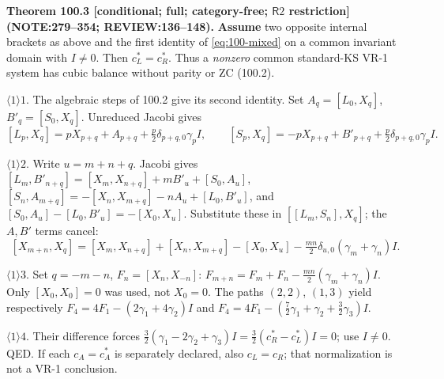 \textbf{Theorem 100.3 [conditional; full; category-free; \(\mathsf R2\) restriction] (NOTE:279--354; REVIEW:136--148).}
\textbf{Assume} two opposite internal brackets as above and the first identity of \eqref{eq:100-mixed}
on a common invariant domain with \(I\ne0\). Then \(c_L^*=c_R^*\).
Thus a \emph{nonzero} common standard-KS VR-1 system has cubic balance without parity or ZC (100.2).
\par\(\langle1\rangle1\). The algebraic steps of 100.2 give its second identity. Set
\(A_q=[L_0,X_q]\), \(B'_q=[S_0,X_q]\). Unreduced Jacobi gives
\[
 [L_p,X_q]=pX_{p+q}+A_{p+q}+\tfrac p2\delta_{p+q,0}\gamma_pI,\qquad
 [S_p,X_q]=-pX_{p+q}+B'_{p+q}+\tfrac p2\delta_{p+q,0}\gamma_pI.
\]
\par\(\langle1\rangle2\). Write \(u=m+n+q\). Jacobi gives
\([L_m,B'_{n+q}]=[X_m,X_{n+q}]+mB'_u+[S_0,A_u]\),
\([S_n,A_{m+q}]=-[X_n,X_{m+q}]-nA_u+[L_0,B'_u]\), and
\([S_0,A_u]-[L_0,B'_u]=-[X_0,X_u]\). Substitute these in \([[L_m,S_n],X_q]\); the \(A,B'\) terms cancel:
\[
 [X_{m+n},X_q]=[X_m,X_{n+q}]+[X_n,X_{m+q}]-[X_0,X_u]
 -\tfrac{mn}{2}\delta_{u,0}(\gamma_m+\gamma_n)I.
\]
\par\(\langle1\rangle3\). Set \(q=-m-n\), \(F_n=[X_n,X_{-n}]\):
\(F_{m+n}=F_m+F_n-\tfrac{mn}{2}(\gamma_m+\gamma_n)I\). Only \([X_0,X_0]=0\) was used, not \(X_0=0\).
The paths \((2,2)\), \((1,3)\) yield respectively
\(F_4=4F_1-(2\gamma_1+4\gamma_2)I\) and
\(F_4=4F_1-(\tfrac72\gamma_1+\gamma_2+\tfrac32\gamma_3)I\).
\par\(\langle1\rangle4\). Their difference forces
\(\tfrac32(\gamma_1-2\gamma_2+\gamma_3)I=\tfrac32(c_R^*-c_L^*)I=0\); use \(I\ne0\). QED.
If each \(c_A=c_A^*\) is separately declared, also \(c_L=c_R\); that normalization is not a VR-1 conclusion.

